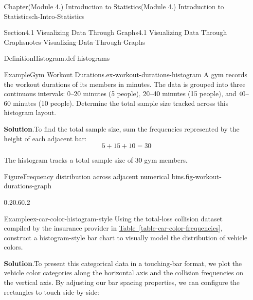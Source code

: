 \documentclass[oneside,10pt,]{book}
\newcommand{\blocktitlefont}{\relax}
\newcommand{\xreffont}{\relax}
\begin{document}
\begin{chapterptx}{Chapter}{(Module 4.) Introduction to Statistics}{}{(Module 4.) Introduction to Statistics}{}{}{ch-Intro-Statistics}
\begin{sectionptx}{Section}{4.1 Visualizing Data Through Graphs}{}{4.1 Visualizing Data Through Graphs}{}{}{notes-Visualizing-Data-Through-Graphs}
\begin{definition}{Definition}{Histogram.}{def-histograms}
\end{definition}
\begin{example}{Example}{Gym Workout Durations.}{ex-workout-durations-histogram}%
A gym records the workout durations of its members in minutes. The data is grouped into three continuous intervals: 0–20 minutes (5 people), 20–40 minutes (15 people), and 40–60 minutes (10 people). Determine the total sample size tracked across this histogram layout.%
\par\smallskip%
\noindent\textbf{\blocktitlefont Solution}.\hypertarget{ex-workout-durations-histogram-3}{}\quad{}To find the total sample size, sum the frequencies represented by the height of each adjacent bar:%
\begin{equation*}
5 + 15 + 10 = 30
\end{equation*}
%
\par
The histogram tracks a total sample size of 30 gym members.%
\begin{figureptx}{Figure}{Frequency distribution across adjacent numerical bins.}{fig-workout-durations-graph}{}%
\begin{image}{0.2}{0.6}{0.2}{}%
%
\end{image}%
\tcblower
\end{figureptx}%
\end{example}
\begin{example}{Example}{}{ex-car-color-histogram-style}%
Using the total-loss collision dataset compiled by the insurance provider in \hyperref[table-car-color-frequencies]{Table~{\xreffont\ref{table-car-color-frequencies}}}, construct a histogram-style bar chart to visually model the distribution of vehicle colors.%
\par\smallskip%
\noindent\textbf{\blocktitlefont Solution}.\hypertarget{ex-car-color-histogram-style-2}{}\quad{}To present this categorical data in a touching-bar format, we plot the vehicle color categories along the horizontal axis and the collision frequencies on the vertical axis. By adjusting our bar spacing properties, we can configure the rectangles to touch side-by-side:%

\end{example}
\end{sectionptx}
\end{chapterptx}
\end{document}
